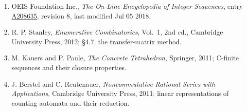 \documentclass[11pt]{article}
\theoremstyle{definition}
\begin{document}
\begin{enumerate}

\item OEIS Foundation Inc., \emph{The On-Line Encyclopedia of Integer Sequences}, entry \href{https://oeis.org/A208635}{A208635}, revision 8, last modified Jul 05 2018.

\item R. P. Stanley, \emph{Enumerative Combinatorics}, Vol.~1, 2nd ed., Cambridge University Press, 2012; \S4.7, the transfer-matrix method.

\item M. Kauers and P. Paule, \emph{The Concrete Tetrahedron}, Springer, 2011; C-finite sequences and their closure properties.

\item J. Berstel and C. Reutenauer, \emph{Noncommutative Rational Series with Applications}, Cambridge University Press, 2011; linear representations of counting automata and their reduction.

\end{enumerate}
\end{document}
